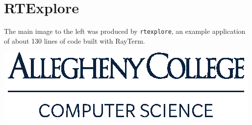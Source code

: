\documentclass[alleghenyposter]{betterposter}
\begin{document}
{\section{RTExplore}
The main image to the left was produced by \texttt{rtexplore}, an example application of about 130 lines of code built with RayTerm.
\vfill

\includegraphics[width=\textwidth]{img/cmpsc-logo}\\

}
\end{document}
